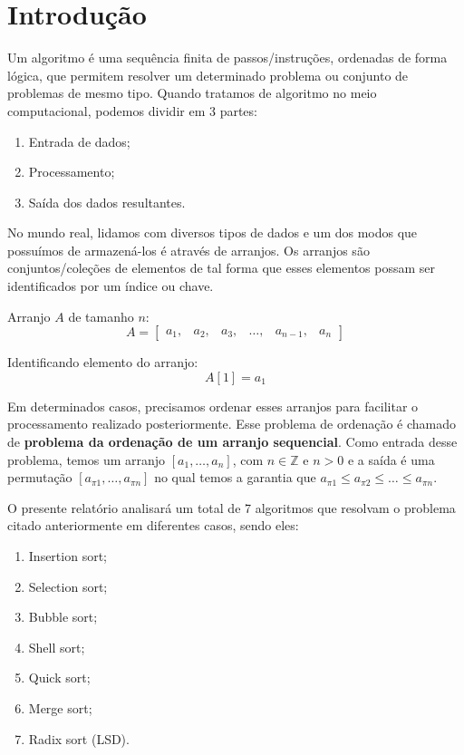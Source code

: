 \chapter{Introdução}
%
%
Um algoritmo é uma sequência finita de passos/instruções, ordenadas de forma lógica, que permitem resolver um determinado problema ou conjunto de problemas de mesmo tipo. Quando tratamos de algoritmo no meio computacional, podemos dividir em 3 partes:
\begin{enumerate}
	\item Entrada de dados;
	\item Processamento;
	\item Saída dos dados resultantes.
\end{enumerate}

%
%
No mundo real, lidamos com diversos tipos de dados e um dos modos que possuímos de armazená-los é através de arranjos. Os arranjos são conjuntos/coleções de elementos de tal forma que esses elementos possam ser identificados por um índice ou chave.

Arranjo $A$ de tamanho $n$:
$$
A = 
\begin{bmatrix}
a_{1}, & a_{2}, & a_{3}, & \dots , & a_{n-1}, & a_{n} 
\end{bmatrix}
$$

Identificando elemento do arranjo:
$$ A[1] = a_{1} $$

%
%
Em determinados casos, precisamos ordenar esses arranjos para facilitar o processamento realizado posteriormente. Esse problema de ordenação é chamado de \textbf{problema da ordenação de um arranjo sequencial}. Como entrada desse problema, temos um arranjo $[ a_{1}, \dots , a_{n} ]$, com $n \in \mathbb{Z}$ e $n > 0$ e a saída é uma permutação $[ a_{\pi1}, \dots , a_{\pi n} ]$ no qual temos a garantia que $a_{\pi 1} \le a_{\pi 2} \le \dots \le a_{\pi n}$.

O presente relatório analisará um total de 7 algoritmos que resolvam o problema citado anteriormente em diferentes casos, sendo eles:
\begin{enumerate}
	\item Insertion sort;
	\item Selection sort;
	\item Bubble sort;
	\item Shell sort;
	\item Quick sort;
	\item Merge sort;
	\item Radix sort (LSD).
\end{enumerate}